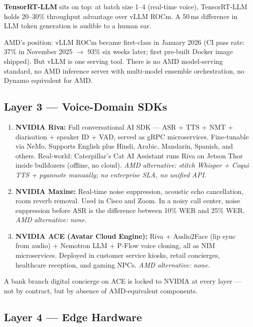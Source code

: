 \documentclass[12pt,a4paper]{article}
\begin{document}
\textbf{TensorRT-LLM} sits on top: at batch size 1--4 (real-time voice),
TensorRT-LLM holds 20--30\% throughput advantage over vLLM ROCm.  A 50\,ms
difference in LLM token generation is audible to a human ear.

AMD's position: vLLM ROCm became first-class in January 2026 (CI pass rate:
37\% in November 2025 $\to$ 93\% six weeks later; first pre-built Docker image
shipped).  But vLLM is one serving tool.  There is no AMD model-serving
standard, no AMD inference server with multi-model ensemble orchestration,
no Dynamo equivalent for AMD.

\subsection{Layer 3 --- Voice-Domain SDKs}

\begin{enumerate}[noitemsep]
  \item \textbf{NVIDIA Riva:} Full conversational AI SDK --- ASR + TTS + NMT + diarisation + speaker ID + VAD, served as gRPC microservices.  Fine-tunable via NeMo.  Supports English plus Hindi, Arabic, Mandarin, Spanish, and others.  Real-world: Caterpillar's Cat AI Assistant runs Riva on Jetson Thor inside bulldozers (offline, no cloud).  \textit{AMD alternative: stitch Whisper + Coqui TTS + pyannote manually; no enterprise SLA, no unified API.}

  \item \textbf{NVIDIA Maxine:} Real-time noise suppression, acoustic echo cancellation, room reverb removal.  Used in Cisco and Zoom.  In a noisy call center, noise suppression before ASR is the difference between 10\% WER and 25\% WER.  \textit{AMD alternative: none.}

  \item \textbf{NVIDIA ACE (Avatar Cloud Engine):} Riva + Audio2Face (lip sync from audio) + Nemotron LLM + P-Flow voice cloning, all as NIM microservices.  Deployed in customer service kiosks, retail concierges, healthcare reception, and gaming NPCs.  \textit{AMD alternative: none.}
\end{enumerate}

A bank branch digital concierge on ACE is locked to NVIDIA at every layer
--- not by contract, but by absence of AMD-equivalent components.

\subsection{Layer 4 --- Edge Hardware}
\end{document}
